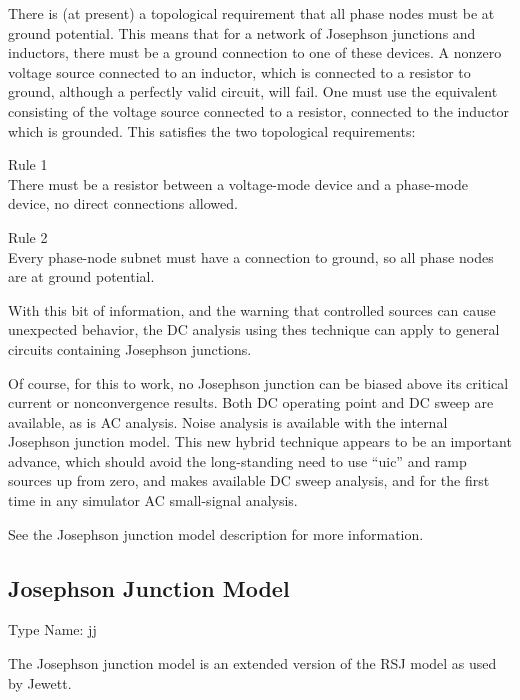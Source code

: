 There is (at present) a topological requirement that all phase nodes
must be at ground potential.  This means that for a network of
Josephson junctions and inductors, there must be a ground connection
to one of these devices.  A nonzero voltage source connected to an
inductor, which is connected to a resistor to ground, although a
perfectly valid circuit, will fail.  One must use the equivalent
consisting of the voltage source connected to a resistor, connected to
the inductor which is grounded.  This satisfies the two topological
requirements:

\begin{description}
\item{Rule 1}\\
There must be a resistor between a voltage-mode device and a
phase-mode device, no direct connections allowed.

\item{Rule 2}\\
Every phase-node subnet must have a connection to ground, so all phase
nodes are at ground potential.
\end{description}

With this bit of information, and the warning that controlled sources
can cause unexpected behavior, the DC analysis using thes technique
can apply to general circuits containing Josephson junctions.

Of course, for this to work, no Josephson junction can be biased above
its critical current or nonconvergence results.  Both DC operating
point and DC sweep are available, as is AC analysis.  Noise analysis
is available with the internal Josephson junction model.  This new
hybrid technique appears to be an important advance, which should
avoid the long-standing need to use ``{\vt uic}'' and ramp sources up
from zero, and makes available DC sweep analysis, and for the first
time in any simulator AC small-signal analysis.

See the Josephson junction model description for more information.


\subsection{Josephson Junction Model}
\label{jjmodel}


{\cb Type Name:} {\vt jj}

The Josephson junction model is an extended version of the RSJ model
as used by Jewett\cite{jewett}.

